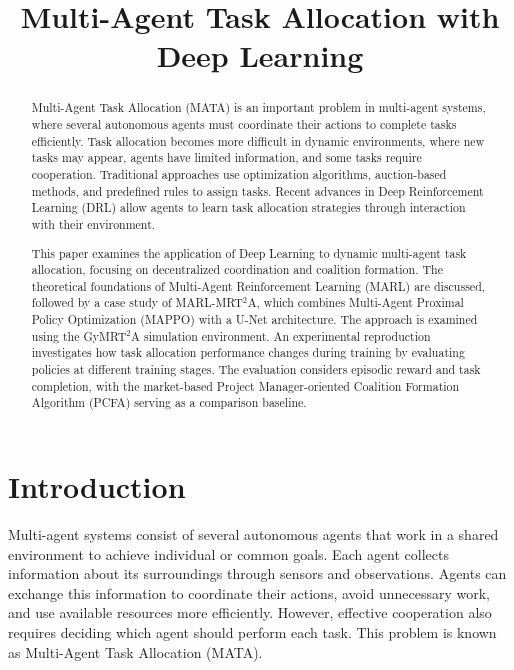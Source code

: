 \documentclass[conference]{IEEEtran}
\begin{document}
\title{Multi-Agent Task Allocation with Deep Learning}

\author{
}

\maketitle

\begin{abstract}
Multi-Agent Task Allocation (MATA) is an important problem in multi-agent systems, where several autonomous agents must
coordinate their actions to complete tasks efficiently. Task allocation becomes more difficult in dynamic environments,
where new tasks may appear, agents have limited information, and some tasks require cooperation. Traditional approaches
use optimization algorithms, auction-based methods, and predefined rules to assign tasks. Recent advances in Deep
Reinforcement Learning (DRL) allow agents to learn task allocation strategies through interaction with their environment.

This paper examines the application of Deep Learning to dynamic multi-agent task allocation, focusing on decentralized
coordination and coalition formation. The theoretical foundations of Multi-Agent Reinforcement Learning (MARL) are
discussed, followed by a case study of MARL-MRT$^2$A, which combines Multi-Agent Proximal Policy Optimization (MAPPO) with
a U-Net architecture. The approach is examined using the GyMRT$^2$A simulation environment. An experimental reproduction
investigates how task allocation performance changes during training by evaluating policies at different training stages.
The evaluation considers episodic reward and task completion, with the market-based Project Manager-oriented Coalition
Formation Algorithm (PCFA) serving as a comparison baseline.
\end{abstract}

\section{Introduction}
Multi-agent systems consist of several autonomous agents that work in a shared environment to achieve individual or
common goals. Each agent collects information about its surroundings through sensors and observations. Agents can
exchange this information to coordinate their actions, avoid unnecessary work, and use available resources more
efficiently. However, effective cooperation also requires deciding which agent should perform each task. This problem
is known as Multi-Agent Task Allocation (MATA).
\end{document}
